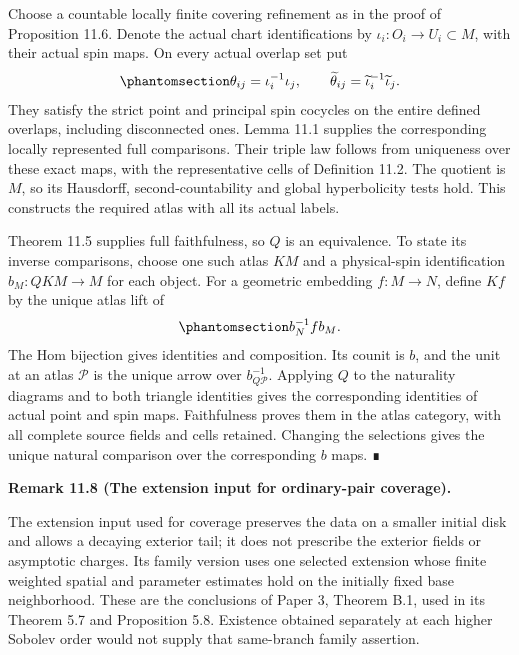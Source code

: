 \documentclass[
  english,
  11pt,
  reqno]{amsart}
\makeatletter
\newcommand{\pandocstatementheading}[1]{%
  \par\addpenalty{\@beginparpenalty}%
  \addvspace{.5\baselineskip plus .2\baselineskip minus .2\baselineskip}%
  {\normalfont\bfseries #1\par}%
  \nobreak\@afterindenttrue\@afterheading
}
\makeatother
\begin{document}
Choose a countable locally finite covering refinement as in the proof of
Proposition 11.6. Denote the actual chart identifications by
\(\iota_i:O_i\to U_i\subset M\), with their actual spin maps. On every
actual overlap set put
\begin{equation}\protect\phantomsection\label{eq:ordinary-atlas-coverage-transitions}{
\theta_{ij}=\iota_i^{-1}\iota_j,
\qquad
\widetilde\theta_{ij}
=\widetilde\iota_i^{-1}\widetilde\iota_j.
}\end{equation} They satisfy the strict point and principal spin
cocycles on the entire defined overlaps, including disconnected ones.
Lemma 11.1 supplies the corresponding locally represented full
comparisons. Their triple law follows from uniqueness over these exact
maps, with the representative cells of Definition 11.2. The quotient is
\(M\), so its Hausdorff, second-countability and global hyperbolicity
tests hold. This constructs the required atlas with all its actual
labels.

Theorem 11.5 supplies full faithfulness, so \(Q\) is an equivalence. To
state its inverse comparisons, choose one such atlas \(K M\) and a
physical-spin identification \(b_M:QK M\to M\) for each object. For a
geometric embedding \(f:M\to N\), define \(Kf\) by the unique atlas lift
of
\begin{equation}\protect\phantomsection\label{eq:ordinary-atlas-inverse-arrow}{
b_N^{-1} f b_M.
}\end{equation} The Hom bijection gives identities and composition. Its
counit is \(b\), and the unit at an atlas \(\mathcal P\) is the unique
arrow over \(b_{Q\mathcal P}^{-1}\). Applying \(Q\) to the naturality
diagrams and to both triangle identities gives the corresponding
identities of actual point and spin maps. Faithfulness proves them in
the atlas category, with all complete source fields and cells retained.
Changing the selections gives the unique natural comparison over the
corresponding \(b\) maps. ∎

\pandocstatementheading{\protect{}\label{rem:ordinary-atlas-dependency-scope}Remark 11.8 (The extension input for ordinary-pair coverage).}

The extension input used for coverage preserves the data on a smaller
initial disk and allows a decaying exterior tail; it does not prescribe
the exterior fields or asymptotic charges. Its family version uses one
selected extension whose finite weighted spatial and parameter estimates
hold on the initially fixed base neighborhood. These are the conclusions
of Paper 3, Theorem B.1, used in its Theorem 5.7 and Proposition 5.8.
Existence obtained separately at each higher Sobolev order would not
supply that same-branch family assertion.
\end{document}
